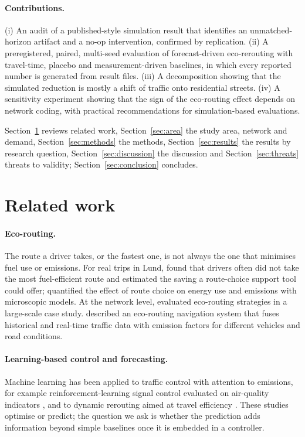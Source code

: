 \documentclass[11pt]{article}
\begin{document}
\paragraph{Contributions.} (i) An audit of a published-style simulation result that identifies an unmatched-horizon
artifact and a no-op intervention, confirmed by replication. (ii) A preregistered, paired, multi-seed evaluation of
forecast-driven eco-rerouting with travel-time, placebo and measurement-driven baselines, in which every reported
number is generated from result files. (iii) A decomposition showing that the simulated reduction is mostly a shift
of traffic onto residential streets. (iv) A sensitivity experiment showing that the sign of the eco-routing effect
depends on network coding, with practical recommendations for simulation-based evaluations.

Section~\ref{sec:related} reviews related work, Section~\ref{sec:area} the study area, network and demand,
Section~\ref{sec:methods} the methods, Section~\ref{sec:results} the results by research question,
Section~\ref{sec:discussion} the discussion and Section~\ref{sec:threats} threats to validity;
Section~\ref{sec:conclusion} concludes.

\section{Related work}\label{sec:related}
\paragraph{Eco-routing.} The route a driver takes, or the fastest one, is not always the one that minimises fuel use
or emissions. For real trips in Lund, \citet{ericsson2006fuel} found that drivers often did not take the most
fuel-efficient route and estimated the saving a route-choice support tool could offer; \citet{ahn2008route}
quantified the effect of route choice on energy use and emissions with microscopic models. At the network level,
\citet{ahn2013ecorouting} evaluated eco-routing strategies in a large-scale case study.
\citet{boriboonsomsin2012ecorouting} described an eco-routing navigation system that fuses historical and real-time
traffic data with emission factors for different vehicles and road conditions.

\paragraph{Learning-based control and forecasting.} Machine learning has been applied to traffic control with
attention to emissions, for example reinforcement-learning signal control evaluated on air-quality indicators
\citep{fazzini2022signals,haydari2021signals}, and to dynamic rerouting aimed at travel efficiency
\citep{du2021rerouting}. These studies optimise or predict; the question we ask is whether the prediction adds
information beyond simple baselines once it is embedded in a controller.
\end{document}
